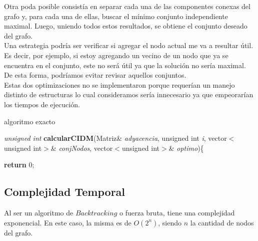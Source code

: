 Otra poda posible consist\'ia en separar cada una de las componentes conexas del grafo y, para cada una de ellas, buscar el m\'inimo conjunto independiente maximal.
Luego, uniendo todos estos resultados, se obtiene el conjunto deseado del grafo.\\

Una estrategia podr\'ia ser verificar si agregar el nodo actual me va a resultar \'util. Es decir, por ejemplo, si estoy agregando un vecino de un nodo que ya se encuentra en el conjunto, este no ser\'a \'util ya que
la soluci\'on no ser\'ia maximal. De esta forma, podr\'iamos evitar revisar aquellos conjuntos.\\

Estas dos optimizaciones no se implementaron porque requer\'ian un manejo distinto de estructuras lo cual consideramos ser\'ia innecesario ya que empeorar\'ian los tiempos de ejecuci\'on.

\newpage
\begin{algorithm}[h!]
\caption{algoritmo exacto}

\textit{unsigned int} \textbf{calcularCIDM}(Matriz\& \textit{adyacencia}, unsigned int \textit{i}, vector$<$unsigned int$>$\& \textit{conjNodos}, vector$<$unsigned int$>$\& \textit{optimo})\{ 
\newline

\textbf{return} 0;
\end{algorithm}

\subsection{Complejidad Temporal}
Al ser un algoritmo de $Backtracking$ o fuerza bruta, tiene una complejidad exponencial. En este caso, la misma es de $O(2^n)$, siendo $n$ la cantidad de nodos del grafo. \\


